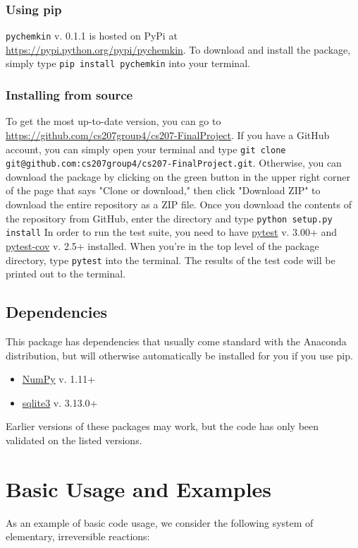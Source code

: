 \documentclass[12pt]{article}
\begin{document}
\subsubsection{Using pip}
\texttt{pychemkin} v. 0.1.1 is hosted on PyPi at \url{https://pypi.python.org/pypi/pychemkin}. To download and install the package, simply type 
\texttt{pip install pychemkin} into your terminal.
\subsubsection{Installing from source}

To get the most up-to-date version, you can go to \url{https://github.com/cs207group4/cs207-FinalProject}. If you have a GitHub account, you can simply open your terminal and type {\tt git clone git@github.com:cs207group4/cs207-FinalProject.git}. Otherwise, you can download the package by clicking on the green button in the upper right corner of the page that says "Clone or download," then click "Download ZIP" to download the entire repository as a ZIP file. Once you download the contents of the repository from GitHub, enter the directory and type {\tt python setup.py install} In order to run the test suite, you need to have \href{https://docs.pytest.org/en/latest/}{pytest} v. 3.00+ and \href{https://pypi.python.org/pypi/pytest-cov}{pytest-cov} v. 2.5+ installed. When you're in the top level of the package directory, type {\tt pytest} into the terminal. The results of the test code will be printed out to the terminal.
 \newline

\subsection{Dependencies}

This package has dependencies that usually come standard with the Anaconda distribution, but will otherwise automatically be installed for you if you use pip.
\begin{itemize}
\item \href{http://www.numpy.org/}{NumPy} v. 1.11+
\item \href{https://www.sqlite.org/}{sqlite3} v. 3.13.0+
\end{itemize}

Earlier versions of these packages may work, but the code has only been validated on the listed versions. 

\section{Basic Usage and Examples}
As an example of basic code usage, we consider the following system of elementary, irreversible reactions:
\end{document}
